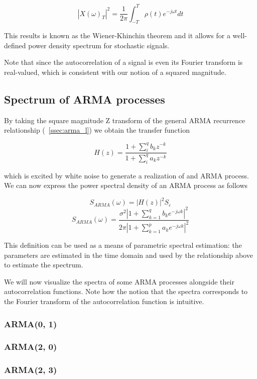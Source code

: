 $$|X(\omega)_T|^2 = \frac{1}{2\pi}\int_{-T}^{T} \rho(t)e^{-j \omega t}dt$$

This results is known as the Wiener-Khinchin theorem and it allows for a
well-defined power density spectrum for stochastic signals.

Note that since the autocorrelation of a signal is even its Fourier transform
is real-valued, which is consistent with our notion of a squared magnitude.

\subsection{Spectrum of ARMA processes}

By taking the square magnitude Z transform of the general ARMA recurrence
relationship (~\ref{ssec:arma_l}) we obtain the transfer function

$$ H(z) = \frac{1 + \sum_{i}^{q} b_k z^{-k}}{1 + \sum_{i}^{q} a_k z^{-k}} $$

which is excited by white noise to generate a realization of and ARMA
process. We can now express the power spectral density of an ARMA process as
follows

$$ S_{ARMA}(\omega) = |H(z)|^2 S_{\varepsilon} $$
$$ S_{ARMA}(\omega) = \frac{\sigma^2 |1 + \sum_{k=1}^{q} b_k e^{-j\omega k}|^2}{2\pi|1 + \sum_{k=1}^{p} a_k e^{-j\omega k}|^2} $$

This definition can be used as a means of parametric spectral estimation: the
parameters are estimated in the time domain and used by the relationship
above to estimate the spectrum.

We will now visualize the spectra of some ARMA processes alongside their
autocorrelation functions. Note how the notion that the spectra corresponds to
the Fourier transform of the autocorrelation function is intuitive.

\subsubsection{ARMA(0, 1)}

\subsubsection{ARMA(2, 0)}

\subsubsection{ARMA(2, 3)}


